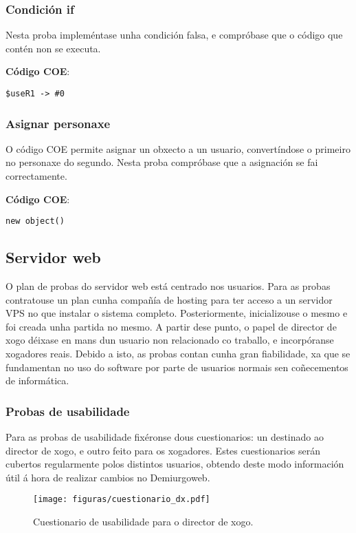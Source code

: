 \subsubsection{Condición if}
Nesta proba impleméntase unha condición falsa, e compróbase que o código que
contén non se executa.

\textbf{Código COE}:
\begin{lstlisting}
$useR1 -> #0
\end{lstlisting}

\subsubsection{Asignar personaxe}
O código COE permite asignar un obxecto a un usuario, convertíndose o primeiro
no personaxe do segundo. Nesta proba compróbase que a asignación se fai
correctamente.

\textbf{Código COE}:
\begin{lstlisting}
new object()
\end{lstlisting}

\subsection{Servidor web}
O plan de probas do servidor web está centrado nos usuarios. Para as probas
contratouse un plan cunha compañía de hosting para ter acceso a un servidor VPS
no que instalar o sistema completo. Posteriormente, inicializouse o mesmo e
foi creada unha partida no mesmo. A partir dese punto, o papel de director de
xogo déixase en mans dun usuario non relacionado co traballo, e incorpóranse
xogadores reais. Debido a isto, as probas contan cunha gran fiabilidade, xa que
se fundamentan no uso do software por parte de usuarios normais sen coñecementos
de informática.
\subsubsection{Probas de usabilidade}
Para as probas de usabilidade fixéronse dous cuestionarios: un destinado ao
director de xogo, e outro feito para os xogadores. Estes cuestionarios serán
cubertos regularmente polos distintos usuarios, obtendo deste modo información
útil á hora de realizar cambios no Demiurgoweb.

\begin{figure}
\centerline{\texttt{[image: figuras/cuestionario\_dx.pdf]}}
\caption{Cuestionario de usabilidade para o director de xogo.}
\label{fig:cuestion-dx}
\end{figure}

